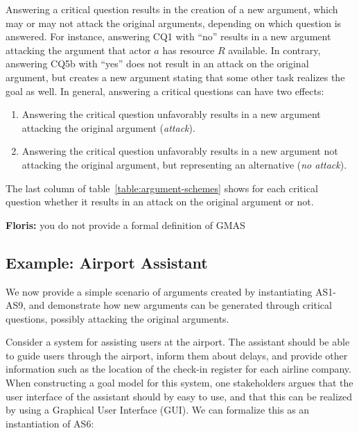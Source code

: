 \documentclass[11.5pt,two column]{llncs}
\newcommand{\floris}[1]{{\color{red}\textbf{Floris: }#1}}
\begin{document}
Answering a critical question results in the creation of a new argument, which may or may not attack the original arguments, depending on which question is answered. For instance, answering CQ1 with ``no'' results in a new argument attacking the argument that actor $a$ has resource $R$ available. In contrary, answering CQ5b with ``yes'' does not result in an attack on the original argument, but creates a new argument stating that some other task realizes the goal as well. In general, answering a critical questions can have two effects: %
\begin{enumerate}
\item
Answering the critical question unfavorably results in a new argument attacking the original argument (\emph{attack}).
\item
Answering the critical question unfavorably results in a new argument not attacking the original argument, but representing an alternative (\emph{no attack}).
\end{enumerate}
The last column of table~\ref{table:argument-schemes} shows for each critical question whether it results in an attack on the original argument or not. 

\floris{you do not provide a formal definition of GMAS} %

\subsection{Example: Airport Assistant}

We now provide a simple scenario of arguments created by instantiating AS1-AS9, and demonstrate how new arguments can be generated through critical questions, possibly attacking the original arguments.

Consider a system for assisting users at the airport. The assistant should be able to guide users through the airport, inform them about delays, and provide other information such as the location of the check-in register for each airline company. When constructing a goal model for this system, one stakeholders argues that the user interface of the assistant should by easy to use, and that this can be realized by using a Graphical User Interface (GUI). We can formalize this as an instantiation of AS6:\\
\end{document}
